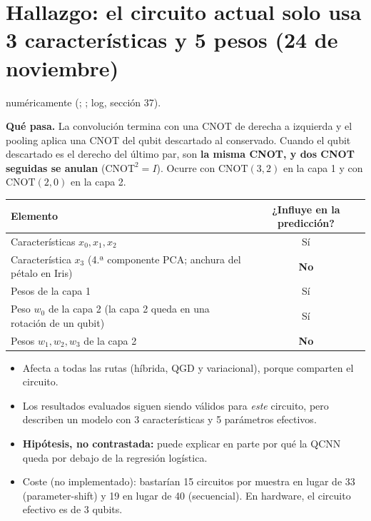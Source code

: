 \documentclass[11pt,a4paper]{article}
\begin{document}
\section{Hallazgo: el circuito actual solo usa 3 características y 5 pesos (24 de noviembre)}\label{sec:cono}

 numéricamente (; ; log,
sección 37).

\textbf{Qué pasa.} La convolución termina con una CNOT de derecha a izquierda y el pooling aplica una CNOT del
qubit descartado al conservado. Cuando el qubit descartado es el derecho del último par, son
\textbf{la misma CNOT, y dos CNOT seguidas se anulan} ($\mathrm{CNOT}^2=I$). Ocurre con $\mathrm{CNOT}(3,2)$ en la
capa 1 y con $\mathrm{CNOT}(2,0)$ en la capa 2.

\begin{table}[H]
\centering\small
\begin{tabular}{lc}
\toprule
Elemento & ¿Influye en la predicción? \\
\midrule
Características $x_0, x_1, x_2$ & Sí \\
Característica $x_3$ (4.ª componente PCA; anchura del pétalo en Iris) & \textbf{No} \\
Pesos de la capa 1 & Sí \\
Peso $w_0$ de la capa 2 (la capa 2 queda en una rotación de un qubit) & Sí \\
Pesos $w_1, w_2, w_3$ de la capa 2 & \textbf{No} \\
\bottomrule
\end{tabular}
\end{table}

\begin{itemize}
  \item Afecta a todas las rutas (híbrida, QGD y variacional), porque comparten el circuito.
  \item Los resultados evaluados siguen siendo válidos para \emph{este} circuito, pero describen un modelo con 3
        características y 5 parámetros efectivos.
  \item \textbf{Hipótesis, no contrastada:} puede explicar en parte por qué la QCNN queda por debajo de la regresión logística.
  \item Coste (no implementado): bastarían 15 circuitos por muestra en lugar de 33 (parameter-shift) y 19 en lugar de 40
        (secuencial). En hardware, el circuito efectivo es de 3 qubits.
\end{itemize}
\end{document}
